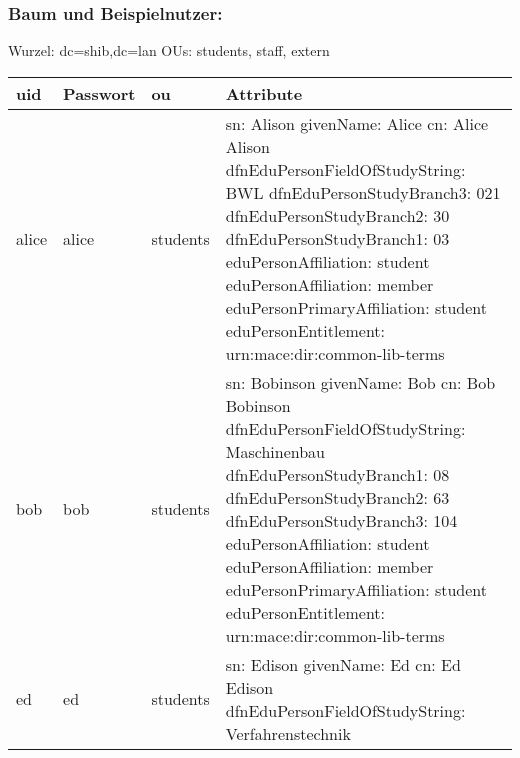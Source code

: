 \subsubsection*{Baum und Beispielnutzer:}
Wurzel: dc=shib,dc=lan\newline
OUs: students, staff, extern\newline
\begin{center}
\footnotesize
	\begin{tabular}{| l | l | l | p{10cm} | }
	\hline
	uid & Passwort & ou & Attribute \\ \hline\hline
	alice & alice & students & 
sn: Alison\newline
givenName: Alice\newline
cn: Alice Alison\newline
dfnEduPersonFieldOfStudyString: BWL\newline
dfnEduPersonStudyBranch3: 021\newline
dfnEduPersonStudyBranch2: 30\newline
dfnEduPersonStudyBranch1: 03\newline
eduPersonAffiliation: student\newline
eduPersonAffiliation: member\newline
eduPersonPrimaryAffiliation: student\newline
eduPersonEntitlement: urn:mace:dir:common-lib-terms
	 \\ \hline 
	 bob & bob & students &
sn: Bobinson\newline
givenName: Bob\newline
cn: Bob Bobinson\newline
dfnEduPersonFieldOfStudyString: Maschinenbau\newline
dfnEduPersonStudyBranch1: 08\newline
dfnEduPersonStudyBranch2: 63\newline
dfnEduPersonStudyBranch3: 104\newline
eduPersonAffiliation: student\newline
eduPersonAffiliation: member\newline
eduPersonPrimaryAffiliation: student\newline
eduPersonEntitlement: urn:mace:dir:common-lib-terms\\ \hline
	ed & ed & students & 
sn: Edison\newline
givenName: Ed\newline
cn: Ed Edison\newline
dfnEduPersonFieldOfStudyString: Verfahrenstechnik\newline

\end{tabular}
\end{center}
